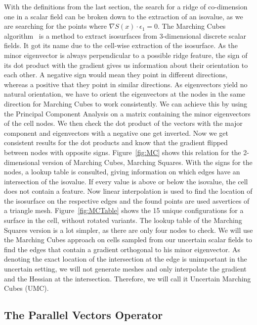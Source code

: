 With the definitions from the last section, the search for a ridge of
co-dimension one in a scalar field can be broken down to the extraction
of an isovalue, as we are searching for the points where $\nabla S(x)
\cdot \epsilon_1 = 0$. The Marching Cubes algorithm~\cite{MC} is a
method to extract isosurfaces from 3-dimensional discrete scalar fields.
It got its name due to the cell-wise extraction of the isosurface. As
the minor eigenvector is always perpendicular to a possible ridge
feature, the sign of its dot product with the gradient gives us
information about their orientation to each other. A negative sign would
mean they point in different directions, whereas a positive that they
point in similar directions. As eigenvectors yield no natural
orientation, we have to orient the eigenvectors at the nodes in the same
direction for Marching Cubes to work consistently. We can achieve this
by using the Principal Component Analysis on a matrix containing the
minor eigenvectors of the cell nodes. We then check the dot product of
the vectors with the major component and eigenvectors with a negative
one get inverted. Now we get consistent results for the dot products and
know that the gradient flipped between nodes with opposite signs.
Figure~\ref{fig:MC} shows this relation for the 2-dimensional version of
Marching Cubes, Marching Squares. With the signs for the nodes, a lookup
table is consulted, giving information on which edges have an
intersection of the isovalue. If every value is above or below the
isovalue, the cell does not contain a feature. Now linear interpolation
is used to find the location of the isosurface on the respective edges
and the found points are used asvertices of a triangle mesh.
Figure~\ref{fig:MCTable} shows the 15 unique configurations for a
surface in the cell, without rotated variants. The lookup table of the
Marching Squares version is a lot simpler, as there are only four nodes
to check. We will use the Marching Cubes approach on cells sampled from
our uncertain scalar fields to find the edges that contain a gradient
orthogonal to his minor eigenvector. As denoting the exact location of the
intersection at the edge is unimportant in the uncertain setting, we will
not generate meshes and only interpolate the gradient and the Hessian at
the intersection. Therefore, we will call it Uncertain Marching Cubes
(UMC).

\subsection{The Parallel Vectors Operator}\label{sec:PVO}

